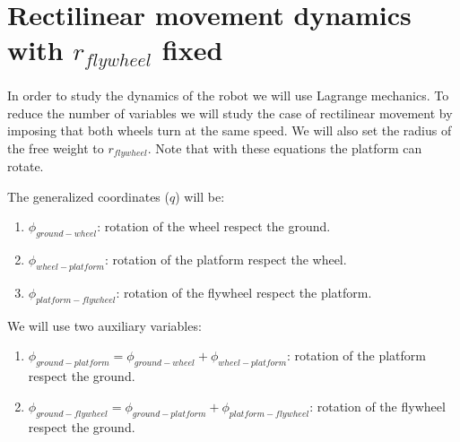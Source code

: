 \section{Rectilinear movement dynamics with $r_{flywheel}$ fixed}

In order to study the dynamics of the robot we will use Lagrange mechanics.
To reduce the number of variables we will study the case of rectilinear
movement by imposing that both wheels turn at the same speed. We will also set
the radius of the free weight to $r_{flywheel}$. Note that with
these equations the platform can rotate.

The generalized coordinates ($q$) will be:
\begin{enumerate}
	\item $\phi_{ground-wheel}$: rotation of the wheel respect the ground.
	\item $\phi_{wheel-platform}$: rotation of the platform respect the wheel.
	\item $\phi_{platform-flywheel}$: rotation of the flywheel respect the platform.
\end{enumerate}

We will use two auxiliary variables:
\begin{enumerate}
	\item $\phi_{ground-platform}=\phi_{ground-wheel}+\phi_{wheel-platform}$: rotation of the platform respect the ground.
	\item $\phi_{ground-flywheel}=\phi_{ground-platform}+\phi_{platform-flywheel}$: rotation of the flywheel respect the ground.
\end{enumerate}

